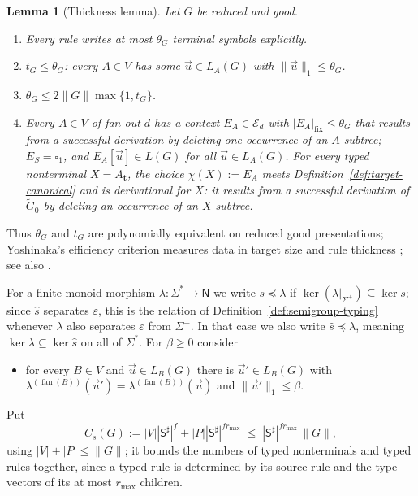 \documentclass[11pt]{article}
\numberwithin{equation}{section}
\theoremstyle{plain}
\newtheorem{lemma}[theorem]{Lemma}
\theoremstyle{definition}
\theoremstyle{remark}
\newcommand{\tuple}[1]{\vec{#1}}
\newcommand{\blank}{\square}
\newcommand{\eps}{\varepsilon}
\newcommand{\fan}{\operatorname{fan}}
\theoremstyle{plain}
\begin{document}
\begin{lemma}[Thickness lemma]
\label{lem:thickness-equivalence}
\label{lem:thickness-local-bounds}
\label{lem:untyped-contexts}
Let $G$ be reduced and good.
\begin{enumerate}[label=\textup{(\roman*)},leftmargin=*]
\item Every rule writes at most $\theta_G$ terminal symbols explicitly.
\item $t_G\le\theta_G$: every $A\in V$ has some $\tuple u\in L_A(G)$ with
$\|\tuple u\|_1\le\theta_G$.
\item $\theta_G\le 2\|G\|\max\{1,t_G\}$.
\item Every $A\in V$ of fan-out $d$ has a context $E_A\in\mathcal E_d$ with
$|E_A|_{\mathrm{fix}}\le\theta_G$ that results from a successful derivation by
deleting one occurrence of an $A$-subtree; $E_S=\blank_1$, and
$E_A[\tuple u]\in L(G)$ for all $\tuple u\in L_A(G)$.  For every typed nonterminal
$X=A_{\mathbf t}$, the choice $\chi(X):=E_A$ meets
Definition~\ref{def:target-canonical} and is \emph{derivational} for $X$: it
results from a successful derivation of $\widetilde G_0$ by deleting an
occurrence of an $X$-subtree.
\end{enumerate}
\end{lemma}

Thus $\theta_G$ and $t_G$ are polynomially equivalent on reduced good
presentations; Yoshinaka's efficiency criterion measures data in target size and
rule thickness \cite[Definition~1]{Yoshinaka2011}; see also
\cite{EyraudHeinzYoshinaka2016}.

For a finite-monoid morphism $\lambda:\Sigma^*\to\mathsf N$ we write $s\preceq\lambda$
if $\ker(\lambda|_{\Sigma^+})\subseteq\ker s$; since $\widehat s$ separates $\eps$,
this is the relation of Definition~\ref{def:semigroup-typing} whenever $\lambda$
also separates $\eps$ from $\Sigma^+$.  In that case we also write
$\widehat s\preceq\lambda$, meaning
$\ker\lambda\subseteq\ker\widehat s$ on all of $\Sigma^*$.
For $\beta\ge0$ consider
\begin{itemize}[leftmargin=4em]
\item[$(\mathrm R_\beta^\lambda)$] for every $B\in V$ and $\tuple u\in L_B(G)$
there is $\tuple u'\in L_B(G)$ with
$\lambda^{(\fan(B))}(\tuple u')=\lambda^{(\fan(B))}(\tuple u)$ and
$\|\tuple u'\|_1\le\beta$.
\end{itemize}
Put
\[
 C_s(G):=|V||\mathsf S^\sharp|^f+|P||\mathsf S^\sharp|^{fr_{\max}}
 \;\le\;|\mathsf S^\sharp|^{fr_{\max}}\,\|G\|,
\]
using $|V|+|P|\le\|G\|$; it bounds the numbers of typed nonterminals and typed
rules together, since a typed rule is determined by its source rule and the type
vectors of its at most $r_{\max}$ children.
\end{document}
